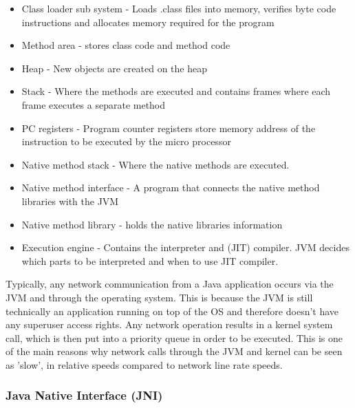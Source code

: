 \documentclass[final_report.tex]{subfiles}
\begin{document}
\begin{itemize}
	\item Class loader sub system - Loads .class files into memory, verifies byte code instructions and allocates memory required for the program
	\item Method area - stores class code and method code
	\item Heap - New objects are created on the heap
	\item Stack - Where the methods are executed and contains frames where each frame executes a separate method
	\item PC registers - Program counter registers store memory address of the instruction to be executed by the micro processor
	\item Native method stack - Where the native methods are executed.
	\item Native method interface - A program that connects the native method libraries with the JVM
	\item Native method library - holds the native libraries information
	\item Execution engine - Contains the interpreter and (JIT) compiler. JVM decides which parts to be interpreted and when to use JIT compiler.
\end{itemize}

Typically, any network communication from a Java application occurs via the JVM and through the operating system. This is because the JVM is still technically an application running on top of the OS and therefore doesn't have any superuser access rights. Any network operation results in a kernel system call, which is then put into a priority queue in order to be executed. This is one of the main reasons why network calls through the JVM and kernel can be seen as 'slow', in relative speeds compared to network line rate speeds.

\subsubsection{Java Native Interface (JNI)}
\end{document}
